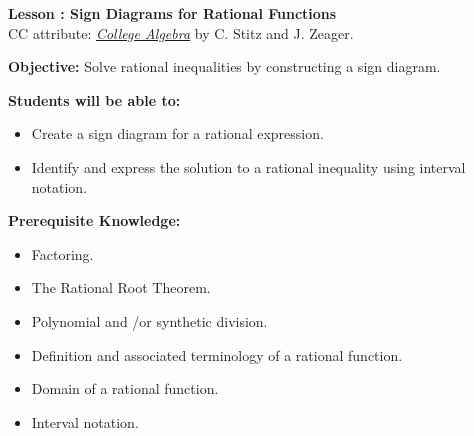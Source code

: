 \documentclass[12pt]{article}
\theoremstyle{definition}
\begin{document}
{\bf \large Lesson : Sign Diagrams for Rational Functions}
\\ CC attribute: \href{http://www.stitz-zeager.com}{\it{College Algebra}} by C. Stitz and J. Zeager. 
\hfill \doclicenseImage[imagewidth=5em]\\
\par
{\bf Objective:} Solve rational inequalities by constructing a sign diagram.\\
\par
{\bf Students will be able to:}
\begin{itemize}
	\item Create a sign diagram for a rational expression. 
	\item Identify and express the solution to a rational inequality using interval notation.
\end{itemize}
{\bf Prerequisite Knowledge:}
\begin{itemize}
	\item Factoring.
	\item The Rational Root Theorem.
	\item Polynomial and \slash or synthetic division.
	\item Definition and associated terminology of a rational function.
	\item Domain of a rational function.
	\item Interval notation.
\end{itemize}
\hrulefill
\end{document}
